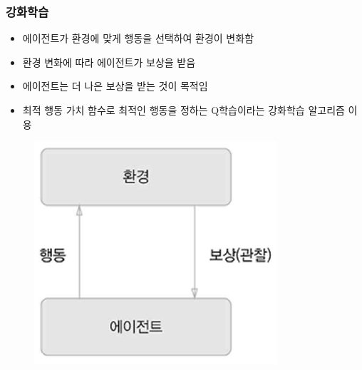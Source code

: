 \documentclass{beamer}
\begin{document}
\begin{frame}
	\frametitle{강화학습}
		\begin{itemize}
			\item 에이전트가 환경에 맞게 행동을 선택하여 환경이 변화함
			\item 환경 변화에 따라 에이전트가 보상을 받음
			\item 에이전트는 더 나은 보상을 받는 것이 목적임
			\item 최적 행동 가치 함수로 최적인 행동을 정하는 Q학습이라는 강화학습 알고리즘 이용
		\end{itemize}
		\begin{figure}
			\includegraphics[width=0.3\columnwidth]{Fig_deep/Figure_16.pdf}
		\end{figure}
\end{frame}
\end{document}
